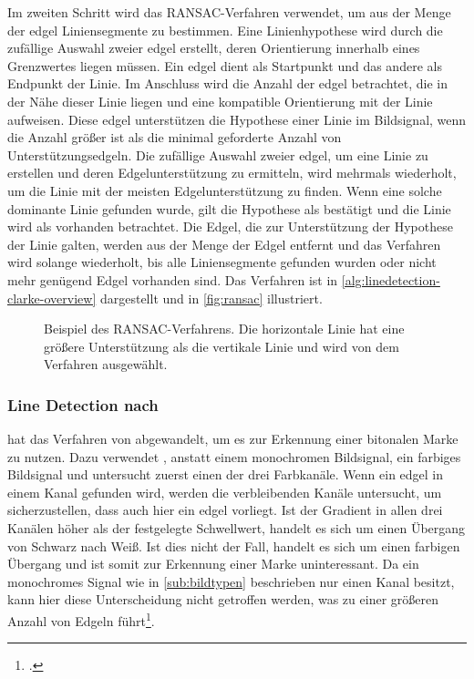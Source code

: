 Im zweiten Schritt wird das RANSAC-Verfahren verwendet, um aus der Menge der \gls{edgel} Liniensegmente zu bestimmen.
 Eine Linienhypothese wird durch die zufällige Auswahl zweier \gls{edgel} erstellt, deren Orientierung innerhalb
 eines Grenzwertes liegen müssen. Ein \gls{edgel} dient als Startpunkt und das andere als Endpunkt der Linie. Im
 Anschluss wird die Anzahl der \gls{edgel} betrachtet, die in der Nähe dieser Linie liegen und eine kompatible
 Orientierung mit der Linie aufweisen. Diese \gls{edgel} unterstützen die Hypothese einer Linie im Bildsignal, wenn
 die Anzahl größer ist als die minimal geforderte Anzahl von Unterstützungsedgeln. Die zufällige Auswahl zweier
 \gls{edgel}, um eine Linie zu erstellen und deren Edgelunterstützung zu ermitteln, wird mehrmals wiederholt, um die
 Linie mit der meisten Edgelunterstützung zu finden. Wenn eine solche dominante Linie gefunden wurde, gilt die
 Hypothese als bestätigt und die Linie wird als vorhanden betrachtet. Die Edgel, die zur Unterstützung der Hypothese
 der Linie galten, werden aus der Menge der Edgel entfernt und das Verfahren wird solange wiederholt, bis alle
 Liniensegmente gefunden wurden oder nicht mehr genügend Edgel vorhanden sind. Das Verfahren ist in
 \autoref{alg:linedetection-clarke-overview} dargestellt und in \autoref{fig:ransac} illustriert.

\begin{figure}[!ht]
	\centering
	
	\caption{Beispiel des RANSAC-Verfahrens. Die horizontale Linie hat eine größere Unterstützung als die vertikale
	 Linie und wird von dem Verfahren ausgewählt.}
	\label{fig:ransac}
\end{figure}

\subsubsection{Line Detection nach \texorpdfstring{\citeauthor{hirzer08}}{Hirzer}} %
\label{sub:line_detection_hirzer}

\citeauthor{hirzer08} hat das Verfahren von \citeauthor{clarke96} abgewandelt, um es zur Erkennung einer bitonalen
 Marke zu nutzen. Dazu verwendet \citeauthor{hirzer08}, anstatt einem monochromen Bildsignal, ein farbiges Bildsignal
 und untersucht zuerst einen der drei Farbkanäle. Wenn ein \gls{edgel} in einem Kanal gefunden wird, werden die
 verbleibenden Kanäle untersucht, um sicherzustellen, dass auch hier ein \gls{edgel} vorliegt. Ist der Gradient in
 allen drei Kanälen höher als der festgelegte Schwellwert, handelt es sich um einen Übergang  von Schwarz nach Weiß.
 Ist dies nicht der Fall, handelt es sich um einen farbigen Übergang und ist somit zur Erkennung einer Marke
 uninteressant. Da ein monochromes Signal wie in \autoref{sub:bildtypen} beschrieben nur einen Kanal besitzt, kann hier
 diese Unterscheidung nicht getroffen werden, was zu einer größeren Anzahl von Edgeln
 führt\footcite[Vgl.][S.~6--7]{hirzer08}.

